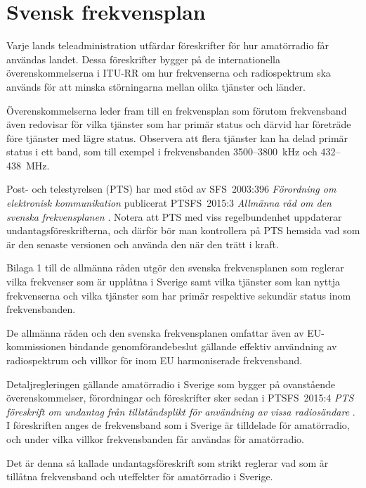 \chapter{Svensk frekvensplan} 
\label{svensk frekvensplan} 

Varje lands teleadministration utfärdar föreskrifter för hur amatörradio får
användas landet.
Dessa föreskrifter bygger på de internationella överenskommelserna i ITU-RR
\cite[ARTICLE 5]{ITU-RR} om hur frekvenserna och radiospektrum ska används för att minska
störningarna mellan olika tjänster och länder.

Överenskommelserna leder fram till en frekvensplan som förutom frekvensband även
redovisar för vilka tjänster som har primär status och därvid har företräde före
tjänster med lägre status.
Observera att flera tjänster kan ha delad primär status i ett band, som till 
exempel i frekvensbanden 3500--3800~kHz och 432--438~MHz. 

Post- och telestyrelsen (PTS) har med stöd av SFS~2003:396
\emph{Förordning om elektronisk kommunikation} \cite{SFS2003:396}
publicerat PTSFS~2015:3 \emph{Allmänna råd om den svenska frekvensplanen}
\cite{PTSFS2015:3}.
Notera att PTS med viss regelbundenhet uppdaterar undantagsföreskrifterna,
och därför bör man kontrollera på PTS hemsida vad som är den senaste versionen
och använda den när den trätt i kraft.

Bilaga 1 till de allmänna råden utgör den svenska frekvensplanen som reglerar
vilka frekvenser som är upplåtna i Sverige samt vilka tjänster som kan nyttja
frekvenserna och vilka tjänster som har primär respektive sekundär status inom
frekvensbanden.

De allmänna råden och den svenska frekvensplanen omfattar även av 
EU-kommissionen bindande genomförandebeslut gällande effektiv användning av
radiospektrum och villkor för inom EU harmoniserade frekvensband.

Detaljregleringen gällande amatörradio i Sverige som bygger på ovanstående
överenskommelser, förordningar och föreskrifter sker sedan i PTSFS~2015:4
\emph{PTS föreskrift om undantag från tillståndsplikt för användning av vissa
  radiosändare} \cite{PTSFS2015:4}.
I föreskriften anges de frekvensband som i Sverige är tilldelade för
amatörradio, och under vilka villkor frekvensbanden får användas för
amatörradio.
 
Det är denna så kallade undantagsföreskrift som strikt reglerar vad som är 
tillåtna frekvensband och uteffekter för amatörradio i Sverige.
 
